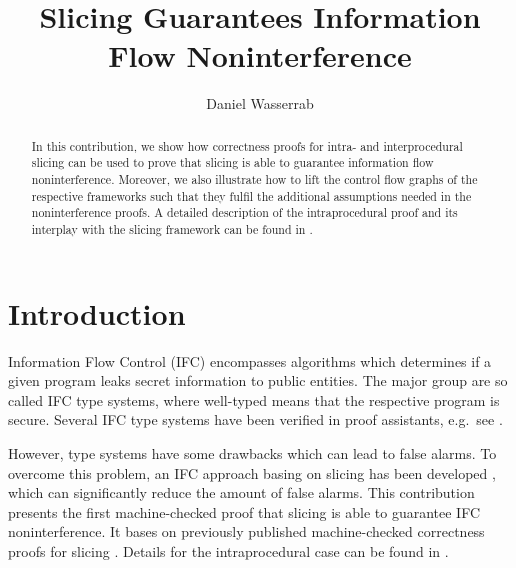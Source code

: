 \documentclass[11pt,a4paper,notitlepage]{article}
\begin{document}
\title{Slicing Guarantees Information Flow Noninterference}
\author{Daniel Wasserrab}
\maketitle

\begin{abstract}
  In this contribution, we show how correctness proofs for intra-
  \cite{Wasserrab:08} and interprocedural slicing \cite{Wasserrab:09}
  can be used to prove that slicing is able to guarantee information
  flow noninterference.  Moreover, we also illustrate how to lift the
  control flow graphs of the respective frameworks such that they
  fulfil the additional assumptions needed in the noninterference
  proofs. A detailed description of the intraprocedural proof and its
  interplay with the slicing framework can be found in
  \cite{WasserrabLS:09}.
\end{abstract}

\section{Introduction}
Information Flow Control (IFC) encompasses algorithms which determines
if a given program leaks secret information to public entities. The major 
group are so called IFC type systems, where well-typed means that the
respective program is secure. Several IFC type systems have been verified
in proof assistants, e.g.\ see \cite{BartheN:04,BarthePR:07,Kammueller:08,BeringerH:08,SneltingW:08}.

However, type systems have some drawbacks which can lead to false alarms.
To overcome this problem, an IFC approach basing on slicing has been developed
\cite{HammerS:09}, which can significantly reduce the amount of false alarms. 
This contribution presents the first machine-checked proof
that slicing is able to guarantee IFC noninterference. It bases on previously
published machine-checked correctness proofs for slicing 
\cite{Wasserrab:08,Wasserrab:09}. Details for the intraprocedural case can
be found in \cite{WasserrabLS:09}.








\end{document}
